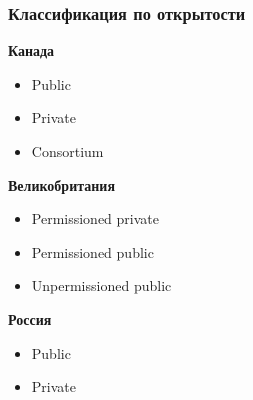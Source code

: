\documentclass{beamer}
\begin{document}
\begin{frame}
    \frametitle{Классификация по открытости}
    \begin{multicols}{3}
        \textbf{Канада}
        \begin{itemize}
            \item Public
            \item Private
            \item Consortium
        \end{itemize}
        \columnbreak
        \textbf{Великобритания}
         \begin{itemize}
                 \small
             \item Permissioned private
             \item Permissioned public
             \item Unpermissioned public
         \end{itemize}
        \columnbreak
        \textbf{Россия}
        \begin{itemize}
            \item Public
            \item Private
        \end{itemize}
    \end{multicols}
\end{frame}
\end{document}
